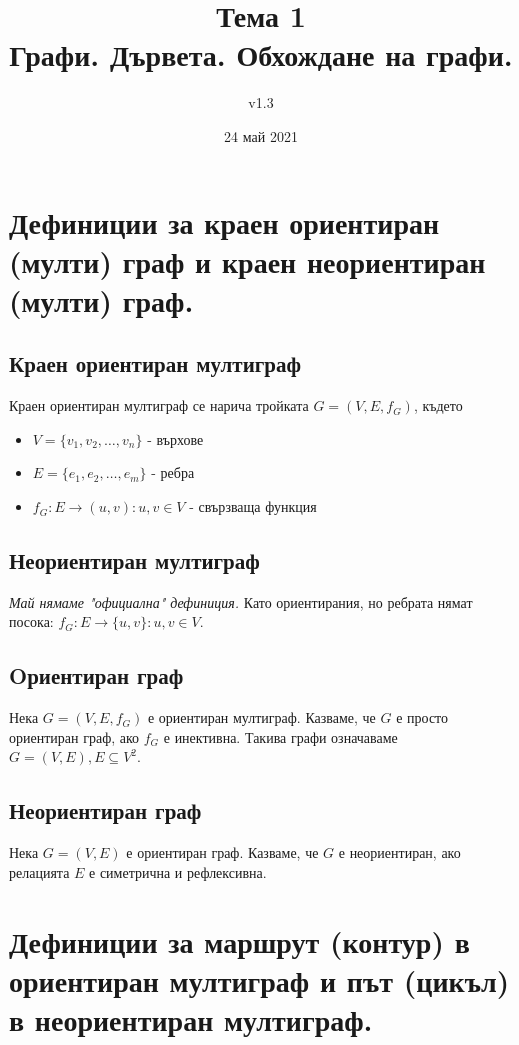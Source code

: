 \documentclass[fleqn,12pt]{article}
\title{Тема 1\\ Графи. Дървета. Обхождане на графи.}
\author{v1.3}
\date{24 май 2021}
\begin{document}
\maketitle

\tableofcontents

\section{Дефиниции за краен ориентиран (мулти) граф и краен неориентиран (мулти) граф.}
\subsection{Краен ориентиран мултиграф}
Краен ориентиран мултиграф се нарича тройката $G = (V, E, f_G)$, където
\begin{itemize}
	\item $V = \{ v_1, v_2, \dots, v_n \}$ - върхове
	\item $E = \{ e_1, e_2, \dots, e_m \}$ - ребра
	\item $f_G : E \rightarrow (u,v) : u,v \in V$ - свързваща функция
\end{itemize}

\subsection{Неориентиран мултиграф}
\textit{Май нямаме "официална" дефиниция. } Като ориентирания, но ребрата нямат посока: $f_G : E \rightarrow \{u,v\} : u,v \in V$.

\subsection{Oриентиран граф}
Нека $G = (V, E, f_G)$ е ориентиран мултиграф. Казваме, че $G$ е просто ориентиран граф, ако $f_G$ е инективна. 
Такива графи означаваме $G = (V, E), E \subseteq V^2$.

\subsection{Неориентиран граф}
Нека $G = (V, E)$ е ориентиран граф. Казваме, че $G$ е неориентиран, ако релацията $E$ е симетрична и рефлексивна.

\section{Дефиниции за маршрут (контур) в ориентиран мултиграф и път (цикъл) в неориентиран мултиграф.}
\end{document}
